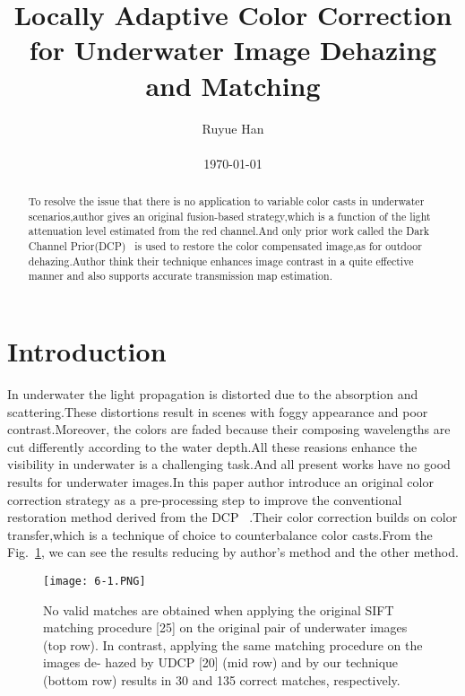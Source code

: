 \documentclass[10pt,twocolumn,letterpaper]{article}
\begin{document}
\title{Locally Adaptive Color Correction for Underwater Image Dehazing and
Matching}

\author{Ruyue Han\\\\ \today}

\maketitle

\begin{abstract}
To resolve the issue that there is no application to variable color casts in underwater scenarios,author gives an original fusion-based strategy,which is a function of the light attenuation level estimated from the red channel.And only prior work called the Dark Channel Prior(DCP)~\cite{Single2009_1} is used to restore the color compensated image,as for outdoor dehazing.Author think their technique enhances image contrast in a quite effective manner and also supports accurate transmission map estimation.
\end{abstract}
\section{Introduction}
In underwater the light propagation is distorted due to the absorption and scattering.These distortions result in scenes with foggy appearance and poor contrast.Moreover, the colors are faded because their composing wavelengths are cut differently according to the water depth.All these reasions enhance the visibility in underwater is a challenging task.And all present works have no good results for underwater images.In this paper author introduce an original color correction strategy as a pre-processing step to improve the conventional restoration method derived from the DCP ~\cite{Single2009_1}.Their color correction builds on color transfer,which is a technique of choice to
counterbalance color casts.From the Fig.~\ref{fig:figure1}, we can see the results    reducing by author's method and the other method.



\begin{figure}[htb]
\centering
\texttt{[image: 6-1.PNG]}
\caption{No valid matches are obtained when applying the original SIFT
matching procedure [25] on the original pair of underwater images (top
row). In contrast, applying the same matching procedure on the images de-
hazed by UDCP [20] (mid row) and by our technique (bottom row) results
in 30 and 135 correct matches, respectively.}
\label{fig:figure1}
\end{figure}
\end{document}

